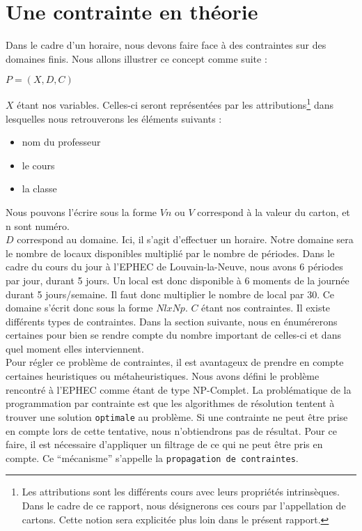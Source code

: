 \section{Une contrainte en théorie}
Dans le cadre d'un horaire, nous devons faire face à des contraintes sur des domaines finis. Nous allons illustrer ce concept comme suite :
\begin{center}
$P=(X,D,C)$
\end{center}

$X$ étant nos variables. Celles-ci seront représentées par les attributions\footnote{Les attributions sont les différents cours avec leurs propriétés intrinsèques. Dans le cadre de ce rapport, nous désignerons ces cours par l'appellation de cartons. Cette notion sera explicitée plus loin dans le présent rapport.} dans lesquelles nous retrouverons les éléments suivants :
\begin{itemize}
\item nom du professeur
\item le cours
\item la classe
\end{itemize}
Nous pouvons l'écrire sous la forme $Vn$ ou $V$ correspond à la valeur du carton, et n sont numéro.\\
\newline
\indent
	$D$ correspond au domaine. Ici, il s'agit d'effectuer un horaire. Notre domaine sera le nombre de locaux disponibles multiplié par le nombre de périodes. Dans le cadre du cours du jour à l'EPHEC de Louvain-la-Neuve, nous avons 6 périodes par jour, durant 5 jours. Un local est donc disponible à 6 moments de la journée durant 5 jours/semaine. Il faut donc multiplier le nombre de local par 30. Ce domaine s'écrit donc sous la forme $Nl x Np$.
\newline
\indent
	$C$ étant nos contraintes. Il existe différents types de contraintes. Dans la section suivante, nous en énumérerons certaines pour bien se rendre compte du nombre important de celles-ci et dans quel moment elles interviennent.\\
\newline
\indent
Pour régler ce problème de contraintes, il est avantageux de prendre en compte certaines heuristiques ou métaheuristiques. Nous avons défini le problème rencontré à l'EPHEC comme  étant de type NP-Complet.
\newline
\indent
La problématique de la programmation par contrainte est que les algorithmes de résolution tentent à trouver une solution \texttt{optimale} au problème. Si une contrainte ne peut être prise en compte lors de cette tentative, nous n'obtiendrons pas de résultat. Pour ce faire, il est nécessaire d'appliquer un filtrage de ce qui ne peut être pris en compte. Ce \enquote{mécanisme} s'appelle la \texttt{propagation de contraintes}.
